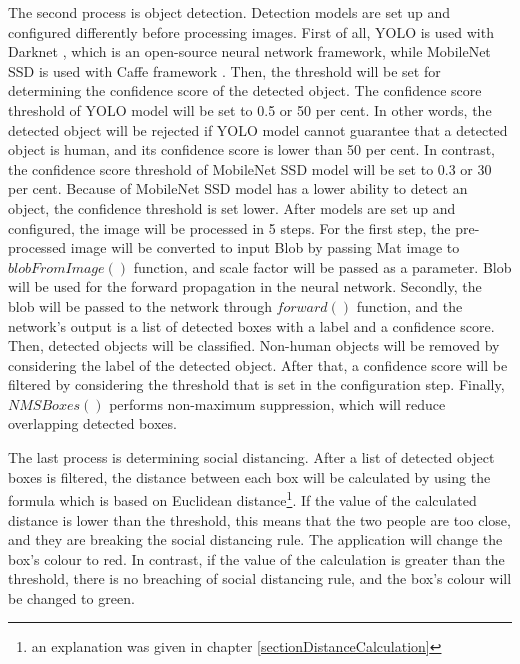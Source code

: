         The second process is object detection.
        Detection models are set up and configured differently before processing images.
        First of all, YOLO is used with Darknet \cite{darknet}, which is an open-source neural network framework,
            while MobileNet SSD is used with Caffe framework \cite{caffe}.
        Then, the threshold will be set for determining the confidence score of the detected object.
            The confidence score threshold of YOLO model will be set to 0.5 or 50 per cent.
            In other words, the detected object will be rejected if YOLO model cannot guarantee that a detected object is human,
            and its confidence score is lower than 50 per cent.
            In contrast, the confidence score threshold of MobileNet SSD model will be set to 0.3 or 30 per cent.
            Because of MobileNet SSD model has a lower ability to detect an object, the confidence threshold is set lower.
        After models are set up and configured, the image will be processed in 5 steps.
        For the first step, the pre-processed image will be converted to input Blob by passing Mat image to $blobFromImage()$ function, and scale factor will be passed as a parameter.
            Blob will be used for the forward propagation in the neural network.
        Secondly, the blob will be passed to the network through $forward()$ function,
            and the network's output is a list of detected boxes with a label and a confidence score.
        Then, detected objects will be classified.
            Non-human objects will be removed by considering the label of the detected object.
        After that, a confidence score will be filtered by considering the threshold that is set in the configuration step.
        Finally, $NMSBoxes()$ performs non-maximum suppression, which will reduce overlapping detected boxes.

        The last process is determining social distancing.
        After a list of detected object boxes is filtered,
        the distance between each box will be calculated by using the formula which is based on Euclidean distance\footnote{an explanation was given in chapter \ref{sectionDistanceCalculation}}.
        If the value of the calculated distance is lower than the threshold,
        this means that the two people are too close, and they are breaking the social distancing rule.
        The application will change the box's colour to red.
        In contrast, if the value of the calculation is greater than the threshold,
        there is no breaching of social distancing rule, and the box's colour will be changed to green.

